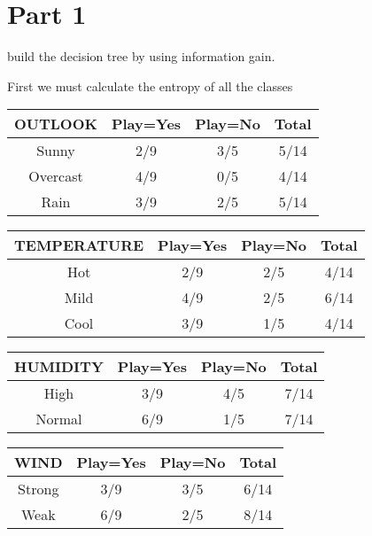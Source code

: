 \documentclass{report}
\begin{document}
\section{Part 1}
build	the	decision	tree	by	using	information	gain.

First we must calculate the entropy of all the classes

\begin{tabular}{ |c|c|c|c| }
  \hline
  \textbf{OUTLOOK} & Play=Yes & Play=No & Total \\
  \hline
  Sunny            & 2/9      & 3/5     & 5/14  \\
  \hline
  Overcast         & 4/9      & 0/5     & 4/14  \\
  \hline
  Rain             & 3/9      & 2/5     & 5/14  \\
  \hline
\end{tabular}

\vspace*{1 cm}

\begin{tabular}{ |c|c|c|c| }
  \hline
  \textbf{TEMPERATURE} & Play=Yes & Play=No & Total \\
  \hline
  Hot                  & 2/9      & 2/5     & 4/14  \\
  \hline
  Mild                 & 4/9      & 2/5     & 6/14  \\
  \hline
  Cool                 & 3/9      & 1/5     & 4/14  \\
  \hline
\end{tabular}

\vspace*{1 cm}

\begin{tabular}{ |c|c|c|c| }
  \hline
  \textbf{HUMIDITY} & Play=Yes & Play=No & Total \\
  \hline
  High              & 3/9      & 4/5     & 7/14  \\
  \hline
  Normal            & 6/9      & 1/5     & 7/14  \\
  \hline
\end{tabular}

\vspace*{1 cm}

\begin{tabular}{ |c|c|c|c| }
  \hline
  \textbf{WIND} & Play=Yes & Play=No & Total \\
  \hline
  Strong        & 3/9      & 3/5     & 6/14  \\
  \hline
  Weak          & 6/9      & 2/5     & 8/14  \\
  \hline
\end{tabular}
\end{document}
